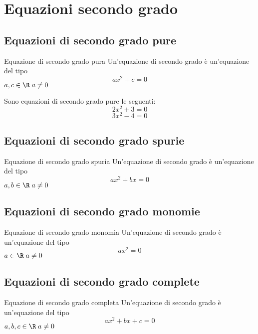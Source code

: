 \chapter{Equazioni secondo grado}
\label{cha:equazioni2grado}
\section{Equazioni di secondo grado pure}
\begin{definizionet}{Equazione di secondo grado pura}{}
	Un'equazione di secondo grado è un'equazione del tipo\[ ax^2+c=0\] $a,c\in\R\;a\neq 0$
\end{definizionet}
\begin{esempiot} {}{}
	Sono equazioni di secondo grado pure le seguenti:
      \[2x^2+3=0 \]
      \[3x^2-4=0 \]
\end{esempiot}
\section{Equazioni di secondo grado spurie}
\begin{definizionet}{Equazione di secondo grado spuria}{}
	Un'equazione di secondo grado è un'equazione del tipo\[ ax^2+bx=0\] $a,b\in\R\;a\neq 0$
\end{definizionet}
\section{Equazioni di secondo grado monomie}
\begin{definizionet}{Equazione di secondo grado monomia}{}
	Un'equazione di secondo grado è un'equazione del tipo\[ ax^2=0\] $a\in\R\;a\neq 0$
\end{definizionet}
\section{Equazioni di secondo grado complete}
\begin{definizionet}{Equazione di secondo grado completa}{}
	Un'equazione di secondo grado è un'equazione del tipo\[ ax^2+bx+c=0\] $a,b,c\in\R\;a\neq 0$
\end{definizionet}


